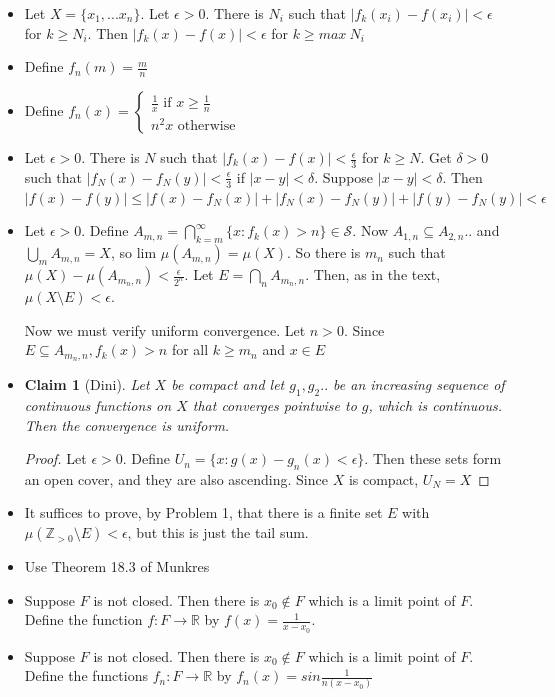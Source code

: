 \documentclass{article}
\newtheorem*{claim}{Claim}
\begin{document}
\begin{itemize}
    \item [1] Let $X= \{x_1,...x_n\}$. Let $\epsilon > 0$. There is $N_i$ such that $|f_k(x_i)-f(x_i)|<\epsilon$ for $k \geq N_i$. Then $|f_k(x)-f(x)|<\epsilon$ for $k \geq max \ N_i$
    \item [2] Define $f_n(m)=\frac{m}{n}$
    \item [3] Define $f_n(x)=\begin{cases}
        \frac{1}{x} \text{ if } x \geq\frac{1}{n} \\
        n^2x \text{ otherwise }
    \end{cases}$
    \item [4] Let $\epsilon > 0$. There is $N$ such that $|f_k(x)-f(x)|< \frac{\epsilon}{3}$ for $k \geq N$. Get $\delta > 0$ such that $|f_N(x)-f_N(y)|<\frac{\epsilon}{3}$ if $|x-y|<\delta$. Suppose $|x-y|<\delta$. Then $|f(x)-f(y)| \leq |f(x) -f_N(x)|+|f_N(x)-f_N(y)|+|f(y)-f_N(y)|<\epsilon$

    \item[6] Let $\epsilon > 0$. Define $A_{m,n}=\bigcap_{k=m}^\infty \{x:f_k(x)>n\}\in \mathcal{S}$. Now $A_{1,n}\subseteq A_{2,n}..$ and $\bigcup_m A_{m,n}=X$, so lim $\mu(A_{m,n})=\mu(X)$. So there is $m_n$ such that $\mu(X)-\mu(A_{m_n,n})<\frac{\epsilon}{2^n}$. Let $E =\bigcap_nA_{m_n,n}$. Then, as in the text, $\mu(X \setminus E)<\epsilon$. 

    Now we must verify uniform convergence. Let $n>0$. Since $E \subseteq A_{m_n,n},f_k(x)>n$ for all $k\geq m_n$ and $x \in E$

    \item [7]\begin{claim}[Dini]
        Let $X$ be compact and let $g_1,g_2..$ be an increasing sequence of continuous functions on $X$ that converges pointwise to $g$, which is continuous. Then the convergence is uniform.
    \end{claim}

    \begin{proof}
        Let $\epsilon > 0$. Define $U_n=\{x:g(x)-g_n(x)<\epsilon\}$. Then these sets form an open cover, and they are also ascending. Since $X$ is compact, $U_N=X$
    \end{proof}

    \item[8] It suffices to prove, by Problem 1, that there is a finite set $E$ with $\mu(\mathbb{Z}_{>0}\setminus E)<\epsilon$, but this is just the tail sum.

    \item[9] Use Theorem 18.3 of Munkres

    \item[10] Suppose $F$ is not closed. Then there is $x_0 \notin F$ which is a limit point of $F$. Define the function $f:F \to \mathbb{R}$ by $f(x)=\frac{1}{x-x_0}$. 

    \item[11] Suppose $F$ is not closed. Then there is $x_0 \notin F$ which is a limit point of $F$. Define the functions $f_n:F \to \mathbb{R}$ by $f_n(x)=sin\frac{1}{n(x-x_0)}$ %

    
\end{itemize}
\end{document}

